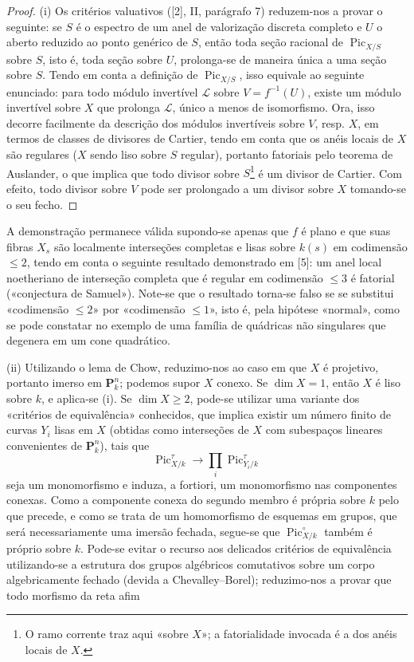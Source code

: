 \begin{proof}
(i) Os critérios valuativos ([2], II, parágrafo 7) reduzem-nos a provar o
seguinte: se $S$ é o espectro de um anel de valorização discreta completo e $U$
o aberto reduzido ao ponto genérico de $S$, então toda seção racional de
$\operatorname{Pic}_{X/S}$ sobre $S$, isto é, toda seção sobre $U$, prolonga-se
de maneira única a uma seção sobre $S$. Tendo em conta a definição de
$\operatorname{Pic}_{X/S}$, isso equivale ao seguinte enunciado: para todo
módulo invertível $\mathcal L$ sobre $V=f^{-1}(U)$, existe um módulo invertível
sobre $X$ que prolonga $\mathcal L$, único a menos de isomorfismo. Ora, isso
decorre facilmente da descrição dos módulos invertíveis sobre $V$, resp. $X$,
em termos de classes de divisores de Cartier, tendo em conta que os anéis
locais de $X$ são regulares ($X$ sendo liso sobre $S$ regular), portanto
fatoriais pelo teorema de Auslander, o que implica que todo divisor sobre
$S$\footnote{O ramo corrente traz aqui «sobre $X$»; a fatorialidade invocada é
a dos anéis locais de $X$.} é um divisor de Cartier. Com efeito, todo divisor
sobre $V$ pode ser prolongado a um divisor sobre $X$ tomando-se o seu fecho.
\end{proof}

 A demonstração permanece válida supondo-se apenas que
$f$ é plano e que suas fibras $X_s$ são localmente interseções completas e
lisas sobre $k(s)$ em codimensão $\leq2$, tendo em conta o seguinte resultado
demonstrado em [5]: um anel local noetheriano de interseção completa que é
regular em codimensão $\leq3$ é fatorial («conjectura de Samuel»). Note-se que o
resultado torna-se falso se se substitui «codimensão $\leq2$» por «codimensão
$\leq1$», isto é, pela hipótese «normal», como se pode constatar no exemplo de
uma família de quádricas não singulares que degenera em um cone quadrático.

(ii) Utilizando o lema de Chow, reduzimo-nos ao caso em que $X$ é projetivo,
portanto imerso em $\mathbf P_k^n$; podemos supor $X$ conexo. Se $\dim X=1$,
então $X$ é liso sobre $k$, e aplica-se (i). Se
$\dim X\geq2$, pode-se utilizar uma variante dos «critérios de equivalência»
conhecidos, que implica existir um número finito de curvas $Y_i$ lisas em $X$
(obtidas como interseções de $X$ com subespaços lineares convenientes de
$\mathbf P_k^n$), tais que
\[
\operatorname{Pic}_{X/k}^\tau\longrightarrow
\prod_i\operatorname{Pic}_{Y_i/k}^\tau
\]
seja um monomorfismo e induza, a fortiori, um monomorfismo nas componentes
conexas. Como a componente conexa do segundo membro é própria sobre $k$ pelo
que precede, e como se trata de um homomorfismo de esquemas em grupos, que será
necessariamente uma imersão fechada, segue-se que
$\operatorname{Pic}_{X/k}^\circ$ também é próprio sobre $k$. Pode-se evitar o
recurso aos delicados critérios de equivalência utilizando-se a estrutura dos
grupos algébricos comutativos sobre um corpo algebricamente fechado (devida a
Chevalley--Borel); reduzimo-nos a provar que todo morfismo da reta afim

